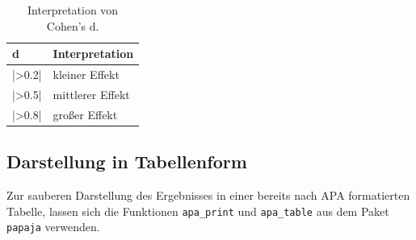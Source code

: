 \documentclass[
]{book}
\newenvironment{Shaded}{\begin{snugshade}}{\end{snugshade}}
\newcommand{\AttributeTok}[1]{\textcolor[rgb]{0.13,0.29,0.53}{#1}}
\newcommand{\FunctionTok}[1]{\textcolor[rgb]{0.13,0.29,0.53}{\textbf{#1}}}
\newcommand{\NormalTok}[1]{#1}
\newcommand{\OtherTok}[1]{\textcolor[rgb]{0.56,0.35,0.01}{#1}}
\newcommand{\SpecialCharTok}[1]{\textcolor[rgb]{0.81,0.36,0.00}{\textbf{#1}}}
\newcommand{\StringTok}[1]{\textcolor[rgb]{0.31,0.60,0.02}{#1}}
\begin{document}
\begin{table}[tbp]

\begin{center}
\begin{threeparttable}

\caption{\label{tab:unnamed-chunk-261}Interpretation von Cohen's d.}

\begin{tabular}{ll}
\toprule
d & \multicolumn{1}{c}{Interpretation}\\
\midrule
|>0.2| & kleiner Effekt\\
|>0.5| & mittlerer Effekt\\
|>0.8| & großer Effekt\\
\bottomrule
\end{tabular}

\end{threeparttable}
\end{center}

\end{table}

\subsection{Darstellung in Tabellenform}\label{darstellung-in-tabellenform-2}

Zur sauberen Darstellung des Ergebnisses in einer bereits nach APA formatierten Tabelle, lassen sich die Funktionen \texttt{apa\_print} und \texttt{apa\_table} aus dem Paket \texttt{papaja} verwenden.

\begin{Shaded}
\end{Shaded}
\end{document}
